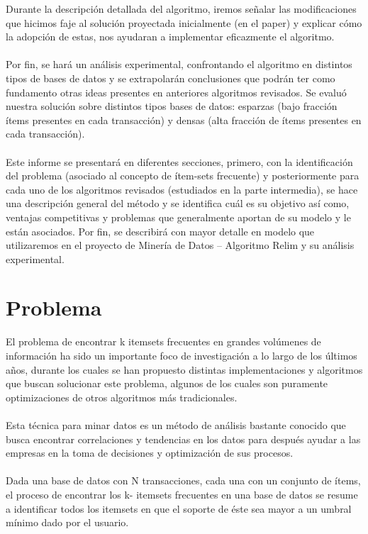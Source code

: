 \documentclass[12pt,spanish]{article}
\begin{document}
Durante la descripción detallada del algoritmo, iremos señalar las modificaciones que hicimos faje al solución proyectada inicialmente (en el paper) y explicar cómo la adopción de  estas, nos ayudaran  a implementar eficazmente el algoritmo.
\\\\
Por fin, se hará un análisis experimental, confrontando el algoritmo en distintos tipos de bases de datos y se extrapolarán conclusiones que podrán ter como fundamento otras ideas presentes en anteriores algoritmos revisados. Se evaluó nuestra solución sobre distintos tipos bases de datos: esparzas (bajo fracción ítems presentes en cada transacción) y densas (alta fracción de ítems presentes en cada transacción). 
\\\\
Este informe se presentará en diferentes secciones, primero, con la identificación del problema (asociado al concepto de ítem-sets frecuente) y posteriormente para cada uno de los algoritmos revisados (estudiados en la parte intermedia), se hace una descripción general del método y se identifica cuál es su objetivo así como, ventajas competitivas y problemas que generalmente aportan de su modelo y le están asociados. Por fin,  se describirá con mayor detalle en modelo que utilizaremos en el proyecto de Minería de Datos –  Algoritmo Relim y su análisis experimental.


\section{Problema}

El problema de encontrar k itemsets frecuentes en grandes volúmenes de información ha sido un importante foco de investigación a lo largo de los últimos años, durante los cuales se han propuesto distintas implementaciones y algoritmos que buscan solucionar este problema, algunos de los cuales son puramente optimizaciones de otros algoritmos más tradicionales.
\\\\
Esta técnica para minar datos es un método de análisis bastante conocido que busca encontrar correlaciones y tendencias en los datos para después ayudar a las empresas en la toma de decisiones  y optimización de sus procesos.
\\\\
Dada una base de datos con N transacciones, cada una con un conjunto de ítems, el proceso de encontrar los k- itemsets frecuentes en una base de datos se resume a identificar todos los itemsets en que el soporte de éste sea mayor a un umbral mínimo dado por el usuario. 
\end{document}
